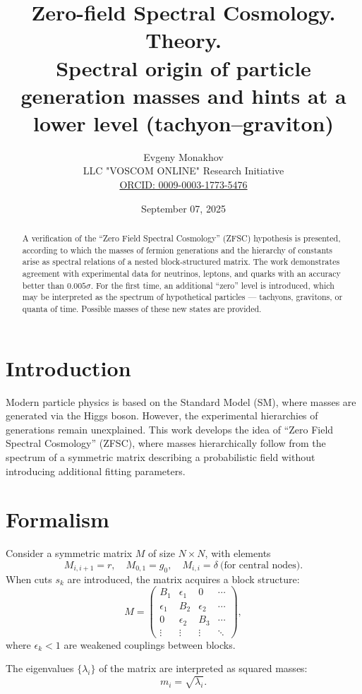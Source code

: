 \documentclass[12pt,a4paper]{article}
\title{Zero-field Spectral Cosmology. Theory.\\
Spectral origin of particle generation masses and hints at a lower level (tachyon--graviton)}
\author{Evgeny Monakhov \\ LLC "VOSCOM ONLINE" Research Initiative \\ \href{https://orcid.org/0009-0003-1773-5476}{ORCID: 0009-0003-1773-5476}}
\date{September 07, 2025}
\begin{document}
\maketitle

\begin{abstract}
A verification of the ``Zero Field Spectral Cosmology'' (ZFSC) hypothesis is presented, according to which the masses of fermion generations and the hierarchy of constants arise as spectral relations of a nested block-structured matrix. 
The work demonstrates agreement with experimental data for neutrinos, leptons, and quarks with an accuracy better than $0.005\sigma$. 
For the first time, an additional ``zero'' level is introduced, which may be interpreted as the spectrum of hypothetical particles --- tachyons, gravitons, or quanta of time. 
Possible masses of these new states are provided. 
\end{abstract}

\section{Introduction}
Modern particle physics is based on the Standard Model (SM), where masses are generated via the Higgs boson. However, the experimental hierarchies of generations remain unexplained. 
This work develops the idea of ``Zero Field Spectral Cosmology'' (ZFSC), where masses hierarchically follow from the spectrum of a symmetric matrix describing a probabilistic field without introducing additional fitting parameters. 

\section{Formalism}
Consider a symmetric matrix $M$ of size $N\times N$, with elements
\[
M_{i,i+1} = r, \quad M_{0,1} = g_0, \quad M_{i,i} = \delta \ \text{(for central nodes)}.
\]
When cuts $s_k$ are introduced, the matrix acquires a block structure:
\[
M = \begin{pmatrix}
B_1 & \epsilon_1 & 0 & \cdots \\
\epsilon_1 & B_2 & \epsilon_2 & \cdots \\
0 & \epsilon_2 & B_3 & \cdots \\
\vdots & \vdots & \vdots & \ddots
\end{pmatrix},
\]
where $\epsilon_k < 1$ are weakened couplings between blocks. 

The eigenvalues $\{\lambda_i\}$ of the matrix are interpreted as squared masses:
\[
m_i = \sqrt{\lambda_i}.
\]
\end{document}
